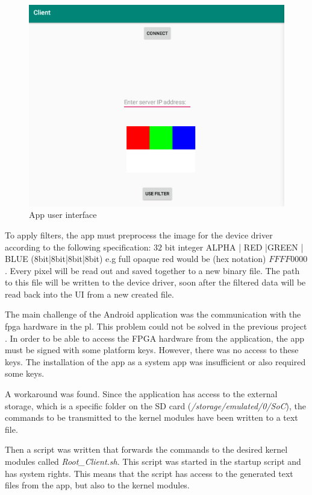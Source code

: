 \begin{figure}[htbp]
    \centering
    \includegraphics[width=1\textwidth]{images/client-screen.png}
    \caption{\label{fig:gui} App user interface}
\end{figure}

To apply filters, the app must preprocess the image for the device driver according to the following specification:
$32$ bit integer
ALPHA | RED |GREEN | BLUE ($8$bit|$8$bit|$8$bit|$8$bit) e.g full opaque red would be (hex notation) $FF FF 00 00$. Every pixel will be read out and saved together to a new binary file. 
The path to this file will be written to the device driver, soon after the filtered data will be read back into the UI from a new created file.

\label{ssssec:clientscript}
The main challenge of the Android application was the communication with the \gls{fpga} hardware in the \gls{pl}. This problem could not be solved in the previous project \cite{oldrepo}. 
In order to be able to access the FPGA hardware from the application, the app must be signed with some platform keys. However, there was no access to these keys. The installation of the app as a system app was insufficient or also required some keys.

A workaround was found. Since the application has access to the external storage, which is a specific folder on the SD card (\emph{/storage/emulated/0/SoC}), the commands to be transmitted to the kernel modules have been written to a text file.

Then a script was written that forwards the commands to the desired kernel modules called \emph{Root_Client.sh}. This script was started in the startup script and has system rights. This means that the script has access to the generated text files from the app, but also to the kernel modules.

